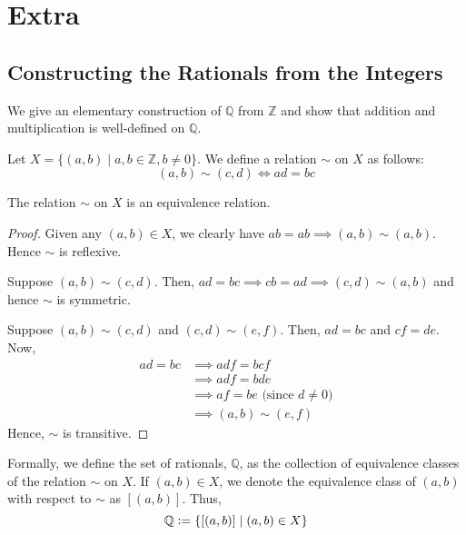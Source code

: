 \section{Extra}

\subsection{Constructing the Rationals from the Integers} \label{subs:Q-from-Z}

We give an elementary construction of $\mathbb{Q}$ from $\mathbb{Z}$ and show that addition and multiplication is well-defined on $\mathbb{Q}$.

\begin{defn}
    Let $X = \{ (a,b) \mid a,b \in \mathbb{Z}, b \neq 0 \}$. We define a relation $\sim$ on $X$ as follows:
    \[
        (a,b) \sim (c,d) \iff ad = bc
    \]
\end{defn}
\begin{lem}
    The relation $\sim$ on $X$ is an equivalence relation. 
\end{lem}
\begin{proof}
    Given any $(a,b) \in X$, we clearly have $ab = ab \implies (a,b) \sim (a,b)$. Hence $\sim$ is reflexive. 
    
    \medskip
    
    Suppose $(a,b) \sim (c,d)$. Then, $ad = bc \implies cb = ad \implies (c,d) \sim (a,b)$ and hence $\sim$ is symmetric.
    
    \medskip
    
    Suppose $(a,b) \sim (c,d)$ and $(c,d) \sim (e,f)$. Then, $ad = bc$ and $cf = de$. Now,
    \begin{align*}
        ad = bc &\implies adf = bcf  \\
        &\implies adf = bde \\
        &\implies af = be \text{ (since $d \neq 0$)}\\ 
        &\implies (a,b) \sim (e,f)
    \end{align*}
    Hence, $\sim$ is transitive.
\end{proof}

\begin{defn}[Rationals]
    Formally, we define the set of rationals, $\mathbb{Q}$, as the collection of equivalence classes of the relation $\sim$ on $X$. If $(a,b) \in X$, we denote the equivalence class of $(a,b)$ with respect to $\sim$ as $[(a,b)]$. Thus,
    \[
        \mathbb{Q} \vcentcolon= \left\{ [(a,b)] \mid (a,b) \in X \right\}
    \]
\end{defn}

